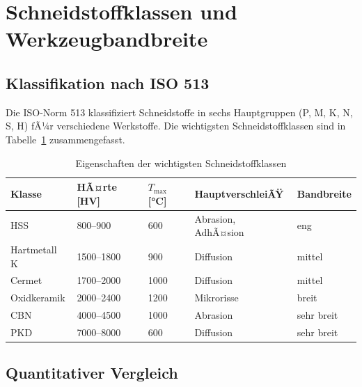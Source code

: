 ﻿\documentclass[a4paper,12pt]{article}
\theoremstyle{definition}
\begin{document}
\section{Schneidstoffklassen und Werkzeugbandbreite}
\label{sec:schneidstoffe}

\subsection{Klassifikation nach ISO 513}

Die ISO-Norm 513 klassifiziert Schneidstoffe in sechs Hauptgruppen (P, M, K, N,
S, H) fÃ¼r verschiedene Werkstoffe. Die wichtigsten Schneidstoffklassen sind in
Tabelle~\ref{tab:schneidstoffe} zusammengefasst.

\begin{table}[ht]
  \centering
  \caption{Eigenschaften der wichtigsten Schneidstoffklassen}
  \label{tab:schneidstoffe}
  \small
  \begin{tabular}{lllll}
    \toprule
    Klasse & HÃ¤rte [HV] & $T_{\max}$ [\si{\celsius}] & HauptverschleiÃŸ & Bandbreite \\
    \midrule
    HSS          & 800--900   & 600  & Abrasion, AdhÃ¤sion & eng   \\
    Hartmetall K & 1500--1800 & 900  & Diffusion          & mittel\\
    Cermet       & 1700--2000 & 1000 & Diffusion          & mittel\\
    Oxidkeramik  & 2000--2400 & 1200 & Mikrorisse         & breit \\
    CBN          & 4000--4500 & 1000 & Abrasion           & sehr breit\\
    PKD          & 7000--8000 & 600  & Diffusion          & sehr breit\\
    \bottomrule
  \end{tabular}
\end{table}

\subsection{Quantitativer Vergleich}
\end{document}
